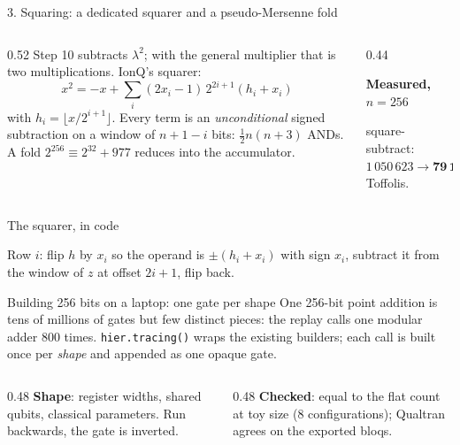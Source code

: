 \documentclass[aspectratio=169,11pt]{beamer}
\newcommand{\peachtitle}[1]{{\bfseries\color{cverm}#1}\par\vskip1mm}
\newcommand{\code}[2][]{}
\begin{document}
\begin{frame}{3. Squaring: a dedicated squarer and a pseudo-Mersenne fold}
  \begin{columns}[T]
    \begin{column}{0.52\textwidth}
      Step 10 subtracts $\lambda^2$; with the general multiplier that is two multiplications. IonQ's squarer:
      \[ x^2=-x+\sum_i(2x_i-1)\,2^{2i+1}(h_i+x_i) \]
      with $h_i=\lfloor x/2^{i+1}\rfloor$. Every term is an \emph{unconditional} signed subtraction on a window of $n+1-i$ bits: $\tfrac12n(n+3)$ ANDs. A fold $2^{256}\equiv2^{32}+977$ reduces into the accumulator.
    \end{column}
    \begin{column}{0.44\textwidth}
      \centering
      \begin{peachblock}\peachtitle{Measured, $n=256$}
        square-subtract: $1\,050\,623\to\mathbf{79\,160}$ Toffolis.
      \end{peachblock}
    \end{column}
  \end{columns}
\end{frame}

\begin{frame}[fragile]{The squarer, in code}
  \code[basicstyle=\ttfamily\footnotesize]{sqr_int.py}
  \vskip2mm
  Row $i$: flip $h$ by $x_i$ so the operand is $\pm(h_i+x_i)$ with sign $x_i$, subtract it from the window of $z$ at offset $2i+1$, flip back.
\end{frame}

\begin{frame}[fragile]{Building 256 bits on a laptop: one gate per shape}
  \small One 256-bit point addition is tens of millions of gates but few distinct pieces: the replay calls one modular adder 800 times. \texttt{hier.tracing()} wraps the existing builders; each call is built once per \emph{shape} and appended as one opaque gate.\par
  \vskip1mm
  \code[basicstyle=\ttfamily\fontsize{7.6}{8.8}\selectfont]{boundary.py}
  \begin{columns}[T]
    \begin{column}{0.48\textwidth}
      {\small \textbf{Shape}: register widths, shared qubits, classical parameters. Run backwards, the gate is inverted.}
    \end{column}
    \begin{column}{0.48\textwidth}
      {\small \textbf{Checked}: equal to the flat count at toy size (8 configurations); Qualtran agrees on the exported bloqs.}
    \end{column}
  \end{columns}
\end{frame}
\end{document}
